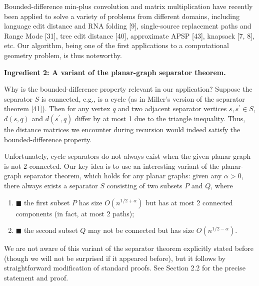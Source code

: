 \documentclass[10pt,a4paper]{article}
\begin{document}
Bounded-difference min-plus convolution and matrix multiplication have recently been applied to solve a variety of problems from different domains, including language edit distance and RNA folding [9], single-source replacement paths and Range Mode [31], tree edit distance [40], approximate APSP [43], knapsack [7, 8], etc. Our algorithm, being one of the first applications to a computational geometry problem, is thus noteworthy.
\par
\par
\par\medskip\noindent\textbf{Ingredient 2: A variant of the planar-graph separator theorem.}\par
Why is the bounded-difference property relevant in our application? Suppose the separator $S$ is connected, e.g., is a cycle (as in Miller’s version of the separator theorem [41]). Then for any vertex $q$ and two adjacent separator vertices $s,s^{\prime}\in S$, $d(s,q)$ and $d(s^{\prime},q)$ differ by at most 1 due to the triangle inequality. Thus, the distance matrices we encounter during recursion would indeed satisfy the bounded-difference property.
\par
\par
Unfortunately, cycle separators do not always exist when the given planar graph is not $2$-connected. Our key idea is to use an interesting variant of the planar-graph separator theorem, which holds for any planar graphs: given any $\alpha>0$, there always exists a separator $S$ consisting of two subsets $P$ and $Q$, where
\par
\begin{enumerate}
\item[]  $\blacksquare$ 
the first subset $P$ has size $O(n^{1/2+\alpha})$ but has at most 2 connected components (in fact, at most 2 paths);
\par
\par
\item[]  $\blacksquare$ 
the second subset $Q$ may not be connected but has size $O(n^{1/2-\alpha})$.
\par
\par
\end{enumerate}
\par
We are not aware of this variant of the separator theorem explicitly stated before (though we will not be surprised if it appeared before), but it follows by straightforward modification of standard proofs. See Section 2.2 for the precise statement and proof.
\end{document}

